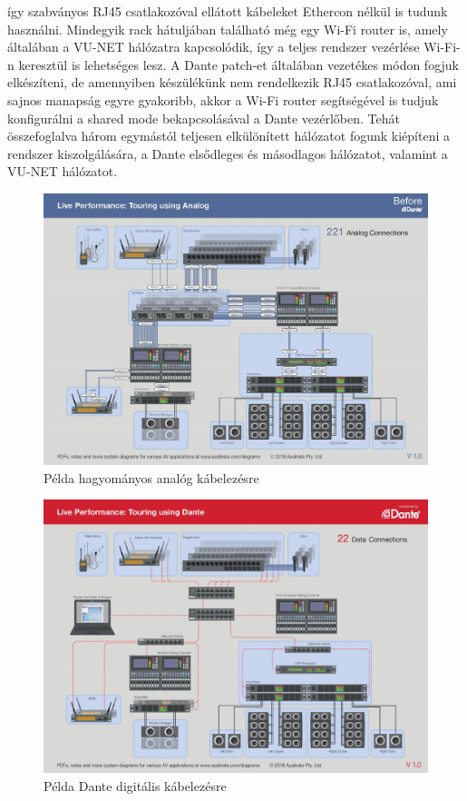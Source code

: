 így szabványos RJ45 csatlakozóval ellátott kábeleket Ethercon nélkül is tudunk használni.
Mindegyik rack hátuljában található még egy Wi-Fi router is, amely általában a VU-NET hálózatra kapcsolódik,
így a teljes rendszer vezérlése Wi-Fi-n keresztül is lehetséges lesz.
A Dante patch-et általában vezetékes módon fogjuk elkészíteni, de amennyiben készülékünk nem rendelkezik RJ45 csatlakozóval,
ami sajnos manapság egyre gyakoribb, akkor a Wi-Fi router segítségével is tudjuk konfigurálni a shared mode bekapcsolásával 
a Dante vezérlőben.
Tehát összefoglalva három egymástól teljesen elkülönített hálózatot fogunk kiépíteni a rendszer kiszolgálására,
a Dante elsődleges és másodlagos hálózatot, valamint a VU-NET hálózatot.

\begin{figure}[H]
	\centering
	\includegraphics[width=\linewidth, keepaspectratio]{figures/live-analog.jpg}
	\caption{Példa hagyományos analóg kábelezésre \cite{APPLICATIONDIAGRAMSFORDANTESYSTEMS}}\label{fig:live-analog}
\end{figure}
\begin{figure}[H]
	\centering
	\includegraphics[width=\linewidth, keepaspectratio]{figures/live-dante.jpg}
	\caption{Példa Dante digitális kábelezésre \cite{APPLICATIONDIAGRAMSFORDANTESYSTEMS}}\label{fig:live-dante}
\end{figure}
